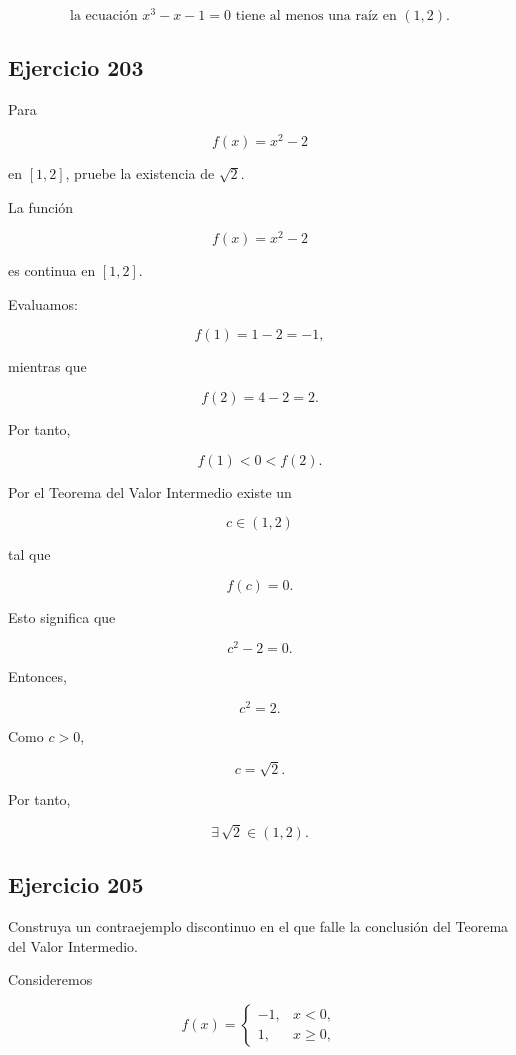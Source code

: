 \documentclass[12pt]{article}
\begin{document}
\[
\boxed{
\text{la ecuación }x^3-x-1=0
\text{ tiene al menos una raíz en }(1,2)
}.
\]

\subsection*{Ejercicio 203}

Para

\[
f(x)=x^2-2
\]

en \([1,2]\), pruebe la existencia de \(\sqrt2\).

La función

\[
f(x)=x^2-2
\]

es continua en \([1,2]\).

Evaluamos:

\[
f(1)=1-2=-1,
\]

mientras que

\[
f(2)=4-2=2.
\]

Por tanto,

\[
f(1)<0<f(2).
\]

Por el Teorema del Valor Intermedio existe un

\[
c\in(1,2)
\]

tal que

\[
f(c)=0.
\]

Esto significa que

\[
c^2-2=0.
\]

Entonces,

\[
c^2=2.
\]

Como \(c>0\),

\[
c=\sqrt2.
\]

Por tanto,

\[
\boxed{
\exists\,\sqrt2\in(1,2)
}.
\]

\subsection*{Ejercicio 205}

Construya un contraejemplo discontinuo en el que falle la conclusión
del Teorema del Valor Intermedio.

Consideremos

\[
f(x)=
\begin{cases}
-1, & x<0,\\[2mm]
1, & x\geq0,
\end{cases}
\]
\end{document}
